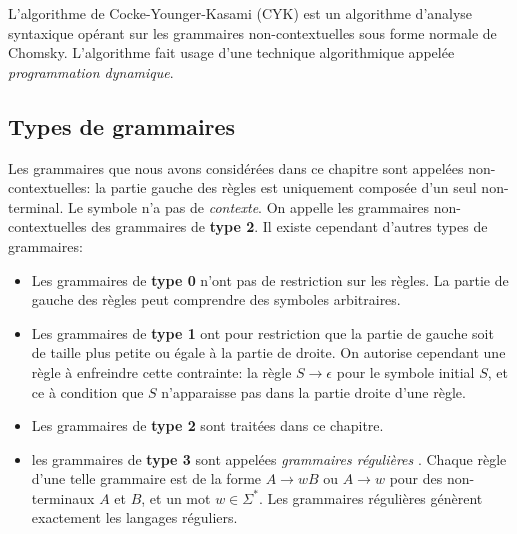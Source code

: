 L'algorithme de Cocke-Younger-Kasami (CYK) est un algorithme d'analyse syntaxique opérant sur les grammaires non-contextuelles sous forme normale de Chomsky. L'algorithme fait usage d'une technique algorithmique appelée \textit{programmation dynamique}.

\subsection{Types de grammaires}

Les grammaires que nous avons considérées dans ce chapitre sont appelées non-contextuelles:
la partie gauche des règles est uniquement composée d'un seul non-terminal.
Le symbole n'a pas de \textit{contexte}.
On appelle les grammaires non-contextuelles des grammaires de \textbf{type 2}.
Il existe cependant d'autres types de grammaires:
\begin{itemize}
\item Les grammaires de \textbf{type 0} n'ont pas de restriction sur les règles. La partie de gauche des règles peut comprendre des symboles arbitraires.
\item Les grammaires de \textbf{type 1} ont pour restriction que la partie de gauche soit de taille plus petite ou égale à la partie de droite.
On autorise cependant une règle à enfreindre cette contrainte: la règle $S \to \epsilon$ pour le symbole initial $S$, et ce à condition que $S$ n'apparaisse pas dans la partie droite d'une règle.
\item Les grammaires de \textbf{type 2} sont traitées dans ce chapitre.
\item les grammaires de \textbf{type 3} sont appelées \og \textit{grammaires régulières} \fg{}. Chaque règle d'une telle grammaire est de la forme $A \to wB$ ou $A \to w$ pour des non-terminaux $A$ et $B$, et un mot $w \in \Sigma^*$. Les grammaires régulières génèrent exactement les langages réguliers.
\end{itemize}